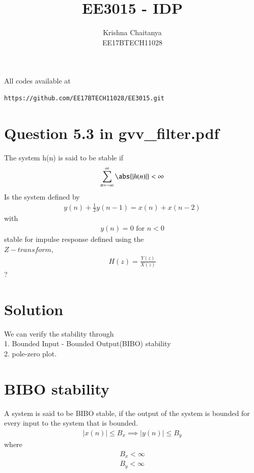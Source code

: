 \documentclass[journal,12pt,twocolumn]{IEEEtran}
\begin{document}
\title{EE3015 - IDP}
\author{Krishna Chaitanya \\
EE17BTECH11028}
\maketitle
\newpage
\medskip
\renewcommand{\thefigure}{\theenumi}
\renewcommand{\thetable}{\theenumi}
All codes available at
\begin{lstlisting}
https://github.com/EE17BTECH11028/EE3015.git
\end{lstlisting}

\section{Question 5.3 in gvv\_filter.pdf}
\medskip 
The system h(n) is said to be stable if 
\begin{align}
     \sum_{n=-\infty}^{\infty} \abs{|h(n)|} < \infty
\end{align} 
Is the system defined by 
\begin{align}
    y(n)+\frac{1}{2}y(n-1) = x(n)+x(n-2) 
\end{align}
with  
\begin{align}
      y(n)=0 \text{ for }n<0
\end{align}
stable for impulse response defined using the\\ $Z-transform$, 
\begin{align}
    H(z) = \frac{Y(z)}{X(z)}
\end{align}
?
\section{Solution}
We can verify the stability through\\ 1. Bounded Input - Bounded Output(BIBO) stability \\ 2. pole-zero plot. 
\section{BIBO stability}
 A system is said to be BIBO stable, if the output of the system is bounded for every input to the system that is bounded.
\begin{align}
    |x(n)|\leq B_x \implies |y(n)| \leq B_y
\end{align}
where
\begin{align}
    B_x < \infty \\ B_y < \infty
\end{align}
\end{document}

